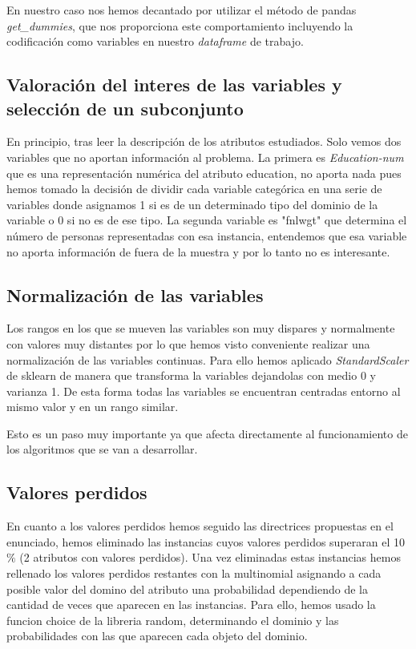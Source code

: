 \documentclass[11pt]{article}
\begin{document}
En nuestro caso nos hemos decantado por utilizar el método de pandas
\textit{get\_dummies}, que nos proporciona este comportamiento incluyendo la
codificación como variables en nuestro \textit{dataframe} de trabajo.

\subsection{Valoración del interes de las variables y selección de un subconjunto}

En principio, tras leer la descripción de los atributos estudiados. Solo vemos
dos variables que no aportan información al problema. La primera es
\textit{Education-num} que es una representación numérica del atributo education, no
aporta nada pues hemos tomado la decisión de dividir cada variable categórica en
una serie de variables donde asignamos 1 si es de un determinado tipo del
dominio de la variable o 0 si no es de ese tipo. La segunda variable es "fnlwgt"
que determina el número de personas representadas con esa instancia, entendemos
que esa variable no aporta información de fuera de la muestra y por lo tanto no
es interesante.

\subsection{Normalización de las variables}

Los rangos en los que se mueven las variables son muy dispares y normalmente con
valores muy distantes por lo que hemos visto conveniente realizar una
normalización de las variables continuas. Para ello hemos aplicado
\textit{StandardScaler} de sklearn de manera que transforma la variables
dejandolas con medio 0 y varianza 1. De esta forma  todas las variables se
encuentran centradas entorno al mismo valor y en un rango similar. 

Esto es un paso muy importante ya que afecta directamente al funcionamiento 
de los algoritmos que se van a desarrollar.

\subsection{Valores perdidos}

En cuanto a los valores perdidos hemos seguido las directrices propuestas en el
enunciado, hemos eliminado las instancias cuyos valores perdidos superaran el
10$\%$ (2 atributos con valores perdidos). Una vez eliminadas estas instancias
hemos rellenado los valores perdidos restantes con la multinomial asignando a
cada posible valor del domino del atributo una probabilidad dependiendo de la
cantidad de veces que aparecen en las instancias. Para ello, hemos usado la
funcion choice de la libreria random, determinando el dominio y las
probabilidades con las que aparecen cada objeto del dominio.
\end{document}
